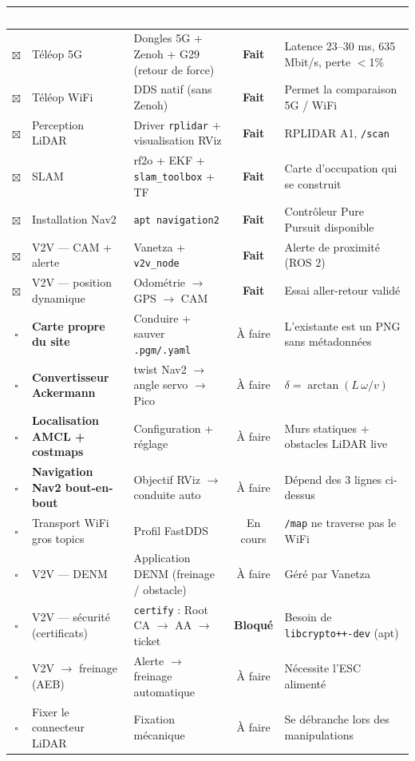 \documentclass[a4paper,10pt]{article}
\newcommand{\ok}{\textcolor{done}{$\boxtimes$}}
\newcommand{\tdo}{$\square$}
\newcommand{\Fait}{\textcolor{done}{\textbf{Fait}}}
\newcommand{\Enc}{\textcolor{prog}{En cours}}
\newcommand{\Bloq}{\textcolor{prog}{\textbf{Bloqué}}}
\newcommand{\Af}{\textcolor{todo}{À faire}}
\newcommand{\hdr}{\rowcolor{headbg}
 \textcolor{white}{\textbf{\checkmark}} & \textcolor{white}{\textbf{Objectif}} &
 \textcolor{white}{\textbf{Étapes clés}} & \textcolor{white}{\textbf{Avanc.}} &
 \textcolor{white}{\textbf{Commentaire}}\\}
\begin{document}
{\small
\begin{tabularx}{\textwidth}{|c|>{\raggedright\arraybackslash}m{2.9cm}|X|c|X|}
\hline
\hdr
\hline
\ok & Téléop 5G & Dongles 5G + Zenoh + G29 (retour de force) & \Fait & Latence 23--30 ms, 635 Mbit/s, perte $<$1\% \\
\rowcolor{rowalt}
\ok & Téléop WiFi & DDS natif (sans Zenoh) & \Fait & Permet la comparaison 5G / WiFi \\
\ok & Perception LiDAR & Driver \texttt{rplidar} + visualisation RViz & \Fait & RPLIDAR A1, \texttt{/scan} \\
\rowcolor{rowalt}
\ok & SLAM & rf2o + EKF + \texttt{slam\_toolbox} + TF & \Fait & Carte d'occupation qui se construit \\
\ok & Installation Nav2 & \texttt{apt navigation2} & \Fait & Contrôleur Pure Pursuit disponible \\
\rowcolor{rowalt}
\ok & V2V --- CAM + alerte & Vanetza + \texttt{v2v\_node} & \Fait & Alerte de proximité (ROS 2) \\
\ok & V2V --- position dynamique & Odométrie $\rightarrow$ GPS $\rightarrow$ CAM & \Fait & Essai aller-retour validé \\
\hline
\rowcolor{rowalt}
\tdo & \textbf{Carte propre du site} & Conduire + sauver \texttt{.pgm/.yaml} & \Af & L'existante est un PNG sans métadonnées \\
\tdo & \textbf{Convertisseur Ackermann} & twist Nav2 $\rightarrow$ angle servo $\rightarrow$ Pico & \Af & $\delta=\arctan(L\,\omega/v)$ \\
\rowcolor{rowalt}
\tdo & \textbf{Localisation AMCL + costmaps} & Configuration + réglage & \Af & Murs statiques + obstacles LiDAR live \\
\tdo & \textbf{Navigation Nav2 bout-en-bout} & Objectif RViz $\rightarrow$ conduite auto & \Af & Dépend des 3 lignes ci-dessus \\
\rowcolor{rowalt}
\tdo & Transport WiFi gros topics & Profil FastDDS & \Enc & \texttt{/map} ne traverse pas le WiFi \\
\tdo & V2V --- DENM & Application DENM (freinage / obstacle) & \Af & Géré par Vanetza \\
\rowcolor{rowalt}
\tdo & V2V --- sécurité (certificats) & \texttt{certify} : Root CA $\rightarrow$ AA $\rightarrow$ ticket & \Bloq & Besoin de \texttt{libcrypto++-dev} (apt) \\
\tdo & V2V $\rightarrow$ freinage (AEB) & Alerte $\rightarrow$ freinage automatique & \Af & Nécessite l'ESC alimenté \\
\rowcolor{rowalt}
\tdo & Fixer le connecteur LiDAR & Fixation mécanique & \Af & Se débranche lors des manipulations \\
\hline
\end{tabularx}}
\end{document}
